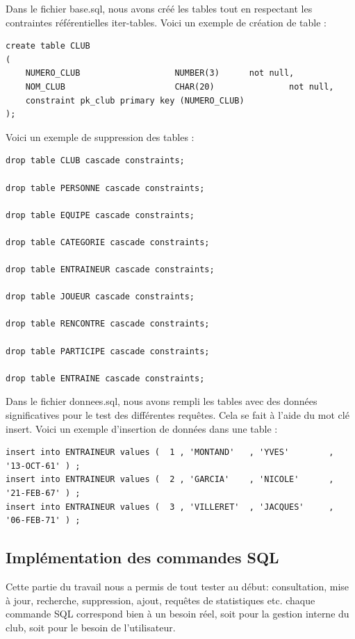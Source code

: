 \documentclass{article}
\begin{document}
Dans le fichier base.sql, nous avons créé les tables tout en respectant les contraintes référentielles iter-tables. Voici un exemple de création de table :  \\

\begin{verbatim}
create table CLUB
(
    NUMERO_CLUB                   NUMBER(3)		 not null,
    NOM_CLUB                      CHAR(20)               not null,	 
    constraint pk_club primary key (NUMERO_CLUB)
); 

\end{verbatim}


Voici un exemple de suppression des tables : \\

\begin{verbatim}
drop table CLUB cascade constraints;

drop table PERSONNE cascade constraints;

drop table EQUIPE cascade constraints;

drop table CATEGORIE cascade constraints;

drop table ENTRAINEUR cascade constraints;

drop table JOUEUR cascade constraints;

drop table RENCONTRE cascade constraints;

drop table PARTICIPE cascade constraints;

drop table ENTRAINE cascade constraints;
\end{verbatim}

Dans le fichier donnees.sql, nous avons rempli les tables avec des données significatives pour le test des différentes requêtes. Cela se fait à l'aide du mot clé insert. 
Voici un exemple d'insertion de données dans une table : \\

\begin{verbatim}
insert into ENTRAINEUR values (  1 , 'MONTAND'   , 'YVES'        , '13-OCT-61' ) ;
insert into ENTRAINEUR values (  2 , 'GARCIA'    , 'NICOLE'      , '21-FEB-67' ) ;
insert into ENTRAINEUR values (  3 , 'VILLERET'  , 'JACQUES'     , '06-FEB-71' ) ;
\end{verbatim}

\subsection{Implémentation des commandes SQL}
Cette partie du travail nous a permis de tout tester au début: consultation, mise à jour, recherche, suppression, ajout, requêtes de statistiques etc. 
chaque commande SQL correspond bien à un besoin réel, soit pour la gestion interne du club, soit pour le besoin de l'utilisateur.
\end{document}
